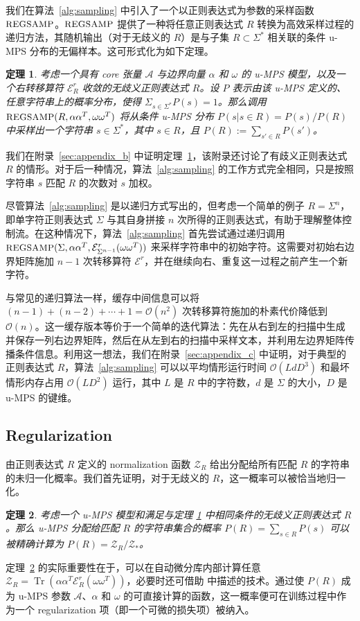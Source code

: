 \documentclass[twoside]{article}
\newtheorem{theorem}{定理}
\newcommand{\Sample}{\textsc{\small REGSAMP}}
\DeclareMathOperator{\Tr}{Tr}
\newcommand{\bigO}{\mc{O}}
\newcommand{\Z}{\mc{Z}}
\newcommand{\ER}{\mc{E}^{\scriptstyle r}}
\newcommand{\alphamat}{\alpha\alpha^T}
\newcommand{\omegamat}{\omega\omega^T}
\newcommand{\mc}[1]{\mathcal{#1}}
\begin{document}
我们在算法~\ref{alg:sampling} 中引入了一个以正则表达式为参数的采样函数 $\Sample$。$\Sample$ 提供了一种将任意正则表达式 $R$ 转换为高效采样过程的递归方法，其随机输出（对于无歧义的 $R$）是与子集 $R \subset \Sigma^*$ 相关联的条件 u-MPS 分布的无偏样本。这可形式化为如下定理。
%
\begin{theorem}
\label{thm:sample}
考虑一个具有 core 张量 $\mc{A}$ 与边界向量 $\alpha$ 和 $\omega$ 的 u-MPS 模型，以及一个右转移算符 $\ER_R$ 收敛的无歧义正则表达式 $R$。设 $P$ 表示由该 u-MPS 定义的、任意字符串上的概率分布，使得 $\Sigma_{s\in\Sigma^*} P(s) = 1$。那么调用 $\Sample(R, \alphamat, \omegamat)$ 将从条件 u-MPS 分布 $P(s | s \in R) = P(s) / P(R)$ 中采样出一个字符串 $s \in \Sigma^*$，其中 $s \in R$，且 $P(R) := \sum_{s' \in R} P(s')$。
\end{theorem}
%
我们在附录~\ref{sec:appendix_b} 中证明定理~\ref{thm:sample}，该附录还讨论了有歧义正则表达式 $R$ 的情形。对于后一种情况，算法~\ref{alg:sampling} 的工作方式完全相同，只是按照字符串 $s$ 匹配 $R$ 的次数对 $s$ 加权。

尽管算法~\ref{alg:sampling} 是以递归方式写出的，但考虑一个简单的例子 $R = \Sigma^n$，即单字符正则表达式 $\Sigma$ 与其自身拼接 $n$ 次所得的正则表达式，有助于理解整体控制流。在这种情况下，算法~\ref{alg:sampling} 首先尝试通过递归调用 $\Sample(\Sigma, \alphamat, \ER_{\Sigma^{n-1}}(\omegamat))$ 来采样字符串中的初始字符。这需要对初始右边界矩阵施加 $n-1$ 次转移算符 $\ER$，并在继续向右、重复这一过程之前产生一个新字符。

与常见的递归算法一样，缓存中间信息可以将 $(n-1) + (n-2) + \cdots + 1 = \bigO(n^2)$ 次转移算符施加的朴素代价降低到 $\bigO(n)$。这一缓存版本等价于一个简单的迭代算法：先在从右到左的扫描中生成并保存一列右边界矩阵，然后在从左到右的扫描中采样文本，并利用左边界矩阵传播条件信息。利用这一想法，我们在附录~\ref{sec:appendix_c} 中证明，对于典型的正则表达式 $R$，算法~\ref{alg:sampling} 可以以平均情形运行时间 $\bigO(L d D^3)$ 和最坏情形内存占用 $\bigO(L D^2)$ 运行，其中 $L$ 是 $R$ 中的字符数，$d$ 是 $\Sigma$ 的大小，$D$ 是 u-MPS 的键维。

\subsection{Regularization}

由正则表达式 $R$ 定义的 normalization 函数 $\Z_{R}$ 给出分配给所有匹配 $R$ 的字符串的未归一化概率。我们首先证明，对于无歧义的 $R$，这一概率可以被恰当地归一化。
%
\begin{theorem}
\label{thm:regularization}
考虑一个 u-MPS 模型和满足与定理 \ref{thm:sample} 中相同条件的无歧义正则表达式 $R$。那么 u-MPS 分配给匹配 $R$ 的字符串集合的概率 $P(R) = \sum_{s \in R} P(s)$ 可以被精确计算为 $P(R) = \Z_R / \Z_*$。
\end{theorem}
%
定理~\ref{thm:regularization} 的实际重要性在于，可以在自动微分库内部计算任意 $\Z_R = \Tr(\alphamat \ER_R(\omegamat))$，必要时还可借助 \citep{liao2019} 中描述的技术。通过使 $P(R)$ 成为 u-MPS 参数 $\mc{A}$、$\alpha$ 和 $\omega$ 的可直接计算的函数，这一概率便可在训练过程中作为一个 regularization 项（即一个可微的损失项）被纳入。
\end{document}
